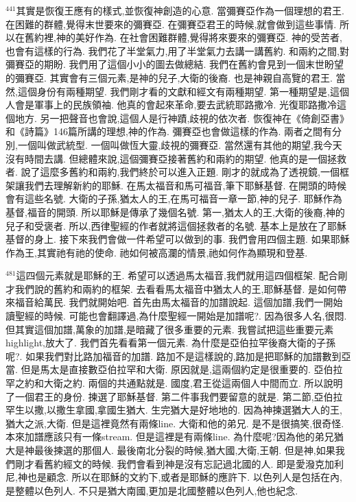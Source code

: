 \documentclass{book}
\begin{document}
$^{441}$其實是恢復王應有的樣式,並恢復神創造的心意.
當彌賽亞作為一個理想的君王.
在困難的群體,覺得末世要來的彌賽亞.
在彌賽亞君王的時候,就會做到這些事情.
所以在舊約裡,神的美好作為.
在社會困難群體,覺得將來要來的彌賽亞.
神的受苦者,也會有這樣的行為.
我們花了半堂氣力,用了半堂氣力去講一講舊約.
和兩約之間,對彌賽亞的期盼.
我們用了這個小小的圖去做總結.
我們在舊約會見到一個末世盼望的彌賽亞.
其實會有三個元素,是神的兒子,大衛的後裔.
也是神親自高覽的君王.
當然,這個身份有兩種期望.
我們剛才看的文獻和經文有兩種期望.
第一種期望是,這個人會是軍事上的民族領袖.
他真的會起來革命,要去武統耶路撒冷.
光復耶路撒冷這個地方.
另一把聲音也會說,這個人是行神蹟,歧視的依次者.
恢復神在《倚創亞書》和《詩篇》146篇所講的理想,神的作為.
彌賽亞也會做這樣的作為.
兩者之間有分別,一個叫做武統型.
一個叫做恆大靈,歧視的彌賽亞.
當然還有其他的期望,我今天沒有時間去講.
但總體來說,這個彌賽亞接著舊約和兩約的期望.
他真的是一個拯救者.
說了這麼多舊約和兩約,我們終於可以進入正題.
剛才的就成為了透視鏡,一個框架讓我們去理解新約的耶穌.
在馬太福音和馬可福音,筆下耶穌基督.
在開頭的時候會有這些名號.
大衛的子孫,猶太人的王,在馬可福音一章一節,神的兒子.
耶穌作為基督,福音的開頭.
所以耶穌是傳承了幾個名號.
第一,猶太人的王,大衛的後裔,神的兒子和受褒者.
所以,西律聖經的作者就將這個拯救者的名號.
基本上是放在了耶穌基督的身上.
接下來我們會做一件希望可以做到的事.
我們會用四個主題.
如果耶穌作為王,其實祂有祂的使命.
祂如何被高瀾的情景,祂如何作為顯現和登基.

$^{481}$這四個元素就是耶穌的王.
希望可以透過馬太福音,我們就用這四個框架.
配合剛才我們說的舊約和兩約的框架.
去看看馬太福音中猶太人的王,耶穌基督.
是如何帶來福音給萬民.
我們就開始吧.
首先由馬太福音的加譜說起.
這個加譜,我們一開始讀聖經的時候.
可能也會翻譯過,為什麼聖經一開始是加譜呢?.
因為很多人名,很悶.
但其實這個加譜,萬象的加譜,是暗藏了很多重要的元素.
我嘗試把這些重要元素highlight,放大了.
我們首先看看第一個元素.
為什麼是亞伯拉罕後裔大衛的子孫呢?.
如果我們對比路加福音的加譜.
路加不是這樣說的,路加是把耶穌的加譜數到亞當.
但是馬太是直接數亞伯拉罕和大衛.
原因就是,這兩個約定是很重要的.
亞伯拉罕之約和大衛之約.
兩個的共通點就是.
國度,君王從這兩個人中間而立.
所以說明了一個君王的身份.
揀選了耶穌基督.
第二件事我們要留意的就是.
第二節,亞伯拉罕生以撒,以撒生拿國,拿國生猶大.
生完猶大是好地地的.
因為神揀選猶大人的王,猶大之派,大衛.
但是這裡竟然有兩條line.
大衛和他的弟兄.
是不是很搞笑,很奇怪.
本來加譜應該只有一條stream.
但是這裡是有兩條line.
為什麼呢?因為他的弟兄猶大是神最後揀選的那個人.
最後南北分裂的時候,猶大國,大衛,王朝.
但是神,如果我們剛才看舊約經文的時候.
我們會看到神是沒有忘記過北國的人.
即是愛潑克加利尼,神也是顧念.
所以在耶穌的文約下,或者是耶穌的應許下.
以色列人是包括在內,是整體以色列人.
不只是猶大南國,更加是北國整體以色列人,他也紀念.
\end{document}

